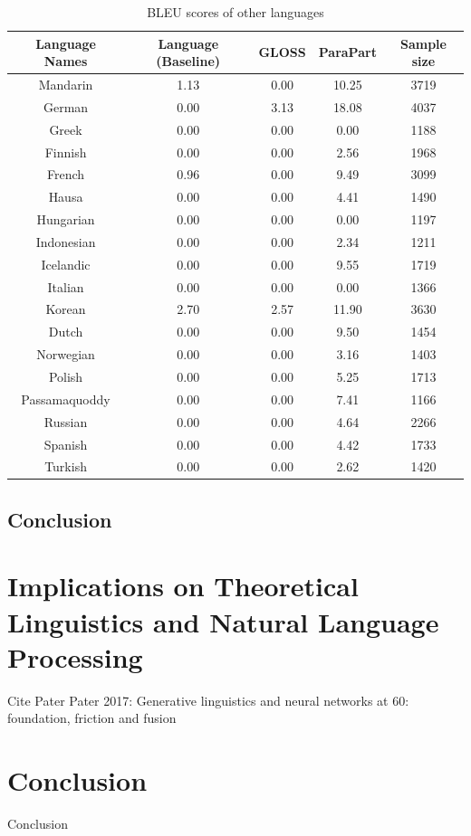 \documentclass[final]{ua-thesis}
\numberwithin{equation}{section}
\begin{document}
\begin{table}[ht]
\centering
\begin{tabular}{ccccc}
  \hline
Language Names & Language (Baseline) & GLOSS & ParaPart & Sample size \\ 
  \hline
Mandarin & 1.13 & 0.00 & 10.25 & 3719 \\ 
  German & 0.00 & 3.13 & 18.08 & 4037 \\ 
  Greek & 0.00 & 0.00 & 0.00 & 1188 \\ 
  Finnish & 0.00 & 0.00 & 2.56 & 1968 \\ 
  French & 0.96 & 0.00 & 9.49 & 3099 \\ 
  Hausa & 0.00 & 0.00 & 4.41 & 1490 \\ 
  Hungarian & 0.00 & 0.00 & 0.00 & 1197 \\ 
  Indonesian & 0.00 & 0.00 & 2.34 & 1211 \\ 
  Icelandic & 0.00 & 0.00 & 9.55 & 1719 \\ 
  Italian & 0.00 & 0.00 & 0.00 & 1366 \\ 
  Korean & 2.70 & 2.57 & 11.90 & 3630 \\ 
  Dutch & 0.00 & 0.00 & 9.50 & 1454 \\ 
  Norwegian & 0.00 & 0.00 & 3.16 & 1403 \\ 
  Polish & 0.00 & 0.00 & 5.25 & 1713 \\ 
  Passamaquoddy & 0.00 & 0.00 & 7.41 & 1166 \\ 
  Russian & 0.00 & 0.00 & 4.64 & 2266 \\ 
  Spanish & 0.00 & 0.00 & 4.42 & 1733 \\ 
  Turkish & 0.00 & 0.00 & 2.62 & 1420 \\ 
   \hline
\end{tabular}
\caption{BLEU scores of other languages} 
\label{Table:Other_LG_BLEU}
\end{table}
\section{Conclusion}
\chapter{Implications on Theoretical Linguistics and Natural Language Processing}
\label{chap:Implications}

Cite Pater 
Pater 2017: Generative linguistics and neural networks at 60: foundation, friction and fusion
\chapter{Conclusion}
Conclusion





\end{document}
